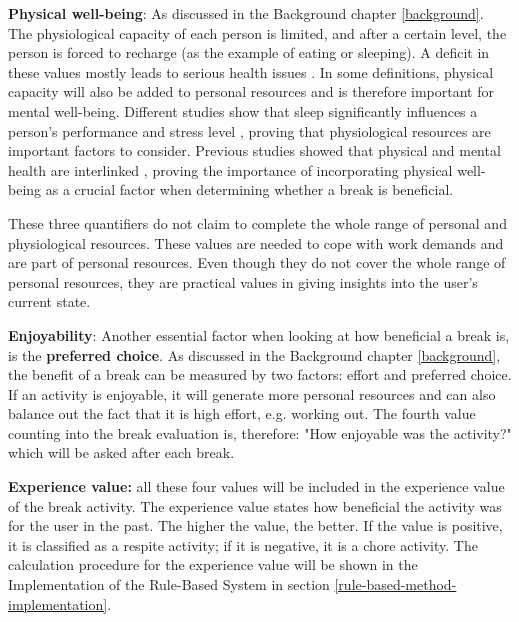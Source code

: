 \documentclass{hasel_thesis}
\begin{document}
\textbf{Physical well-being}: As discussed in the Background chapter \ref{background}. The physiological capacity of each person is limited, and after a certain level, the person is forced to recharge (as the example of eating or sleeping). A deficit in these values mostly leads to serious health issues \cite{Trougakos.2009}. In some definitions, physical capacity will also be added to personal resources and is therefore important for mental well-being. Different studies show that sleep significantly influences a person's performance and stress level \cite{Rosekind.2010, Choi.2018}, proving that physiological resources are important factors to consider. Previous studies showed that physical and mental health are interlinked \cite{Doan.2022}, proving the importance of incorporating physical well-being as a crucial factor when determining whether a break is beneficial. 

These three quantifiers do not claim to complete the whole range of personal and physiological resources. These values are needed to cope with work demands and are part of personal resources. Even though they do not cover the whole range of personal resources, they are practical values in giving insights into the user's current state. 

\textbf{Enjoyability}: Another essential factor when looking at how beneficial a break is, is the \textbf{preferred choice}. As discussed in the Background chapter \ref{background}, the benefit of a break can be measured by two factors: effort and preferred choice. If an activity is enjoyable, it will generate more personal resources and can also balance out the fact that it is high effort, e.g. working out. The fourth value counting into the break evaluation is, therefore: "How enjoyable was the activity?" which will be asked after each break.

\textbf{Experience value:} all these four values will be included in the experience value of the break activity. The experience value states how beneficial the activity was for the user in the past. The higher the value, the better. If the value is positive, it is classified as a respite activity; if it is negative, it is a chore activity. The calculation procedure for the experience value will be shown in the Implementation of the Rule-Based System in section \ref{rule-based-method-implementation}.
\end{document}
